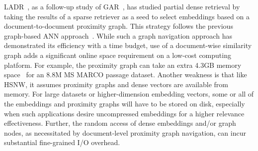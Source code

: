 LADR~\cite{2023SIGIR-LADR}, as a follow-up study of  GAR~\cite{2022CIKM-MacAvaneyGraphReRank},
has studied partial dense retrieval by  
taking  the results of a sparse retriever as a seed to select embeddings
based on a document-to-document proximity graph. This strategy  follows  the previous graph-based ANN approach~\cite{2020TPAMI-HNSW,2021KDDgraphANN}. 
While such a graph navigation approach has demonstrated its  efficiency  with a time budget, 
use  of a document-wise similarity graph adds a significant online space requirement  on a low-cost computing platform. 
For example, the proximity graph  can take an extra 4.3GB memory space~\cite{2023SIGIR-LADR} for an 8.8M  MS MARCO passage dataset.
Another weakness is that like HSNW, it assumes proximity graphs and dense vectors are  available from memory. 
For large datasets or higher-dimension embedding vectors, some or all of the embeddings and proximity graphs will have to be stored on disk,
especially when such  applications desire uncompressed embeddings for  a higher relevance effectiveness. 
Further, the random access of dense embeddings and/or graph nodes, as necessitated by document-level proximity graph navigation, can incur substantial 
fine-grained I/O overhead.


